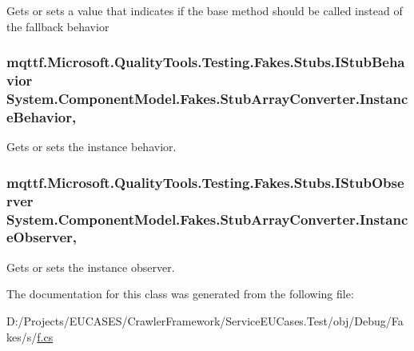 Gets or sets a value that indicates if the base method should be called instead of the fallback behavior

\hypertarget{class_system_1_1_component_model_1_1_fakes_1_1_stub_array_converter_af232904ee982c7df54417ed50b02d6ef}{
\subsubsection[{Instance\-Behavior}]{\setlength{\rightskip}{0pt plus 5cm}mqttf.\-Microsoft.\-Quality\-Tools.\-Testing.\-Fakes.\-Stubs.\-I\-Stub\-Behavior System.\-Component\-Model.\-Fakes.\-Stub\-Array\-Converter.\-Instance\-Behavior\hspace{0.3cm}{\ttfamily [get]}, {\ttfamily [set]}}}\label{class_system_1_1_component_model_1_1_fakes_1_1_stub_array_converter_af232904ee982c7df54417ed50b02d6ef}


Gets or sets the instance behavior.

\hypertarget{class_system_1_1_component_model_1_1_fakes_1_1_stub_array_converter_a2bedc2207b5bebb9d7e48741c9bd1366}{
\subsubsection[{Instance\-Observer}]{\setlength{\rightskip}{0pt plus 5cm}mqttf.\-Microsoft.\-Quality\-Tools.\-Testing.\-Fakes.\-Stubs.\-I\-Stub\-Observer System.\-Component\-Model.\-Fakes.\-Stub\-Array\-Converter.\-Instance\-Observer\hspace{0.3cm}{\ttfamily [get]}, {\ttfamily [set]}}}\label{class_system_1_1_component_model_1_1_fakes_1_1_stub_array_converter_a2bedc2207b5bebb9d7e48741c9bd1366}


Gets or sets the instance observer.



The documentation for this class was generated from the following file\-:\begin{DoxyCompactItemize}
\item 
D\-:/\-Projects/\-E\-U\-C\-A\-S\-E\-S/\-Crawler\-Framework/\-Service\-E\-U\-Cases.\-Test/obj/\-Debug/\-Fakes/s/\hyperlink{s_2f_8cs}{f.\-cs}\end{DoxyCompactItemize}
